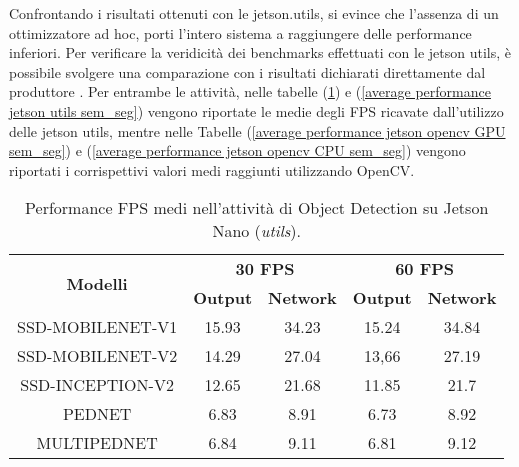 Confrontando i risultati ottenuti con le jetson.utils, si evince che l'assenza di un ottimizzatore ad hoc, porti l'intero sistema a raggiungere delle performance inferiori.
Per verificare la veridicità dei benchmarks effettuati con le jetson utils, è possibile svolgere una comparazione con i risultati dichiarati direttamente dal produttore \cite{performance_obj_det_jetson}.
Per entrambe le attività, nelle tabelle (\ref{average performance jetson utils obj_det}) e (\ref{average performance jetson utils sem_seg}) vengono riportate le medie degli FPS ricavate dall'utilizzo delle jetson utils, mentre nelle Tabelle (\ref{average performance jetson opencv GPU sem_seg}) e (\ref{average performance jetson opencv CPU sem_seg})  vengono riportati i corrispettivi valori medi raggiunti utilizzando OpenCV.

\begin{table}
    \renewcommand{\baselinestretch}{1}
    \centering
    \begin{adjustbox}{max width=\textwidth}
    \begin{tabular}{|c||c|c||c|c||}
        \hline
        \multirow{2}{*}{\bfseries{\Large Modelli}} & \multicolumn{2}{c||}{\bfseries{30 FPS}} & \multicolumn{2}{c||}{\bfseries{60 FPS}}\\            & \bfseries{Output} & \bfseries{Network} & \bfseries{Output} & \bfseries{Network}\\
        \hline
        \hline
        SSD-MOBILENET-V1 & 15.93 & 34.23 & 15.24 & 34.84\\
        \hline
        SSD-MOBILENET-V2 & 14.29 & 27.04 & 13,66 & 27.19\\
        \hline 
        SSD-INCEPTION-V2 & 12.65 & 21.68 & 11.85 & 21.7\\
        \hline
        PEDNET & 6.83 &  8.91 & 6.73 & 8.92\\
        \hline
        MULTIPEDNET & 6.84 & 9.11 & 6.81 & 9.12\\
        \hline
    \end{tabular}
    \end{adjustbox}
    \vspace{0.5cm}
    \caption{Performance FPS medi nell'attività di Object Detection su Jetson Nano (\emph{utils}).}
    \label{average performance jetson utils obj_det}
\end{table}

